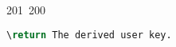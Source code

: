 201~200~\documentclass{article}
\begin{document}
\begin{lstlisting}[language=Python, caption=Hashing and Verifying Passwords with Argon2]
	                                                                                                                                                                                                                                                                                                	                                                                                                                                        	    	                                                                                                	                                                                                                                                                                                                                                                                                                                                	                                                                        	                                                                        	                                                                                                                            \return The derived user key.
	                                                                                                                                                                                                                                                                                                	                                                                                                                                        	    	                                                                                                	                                                                                                                                                                                                                                                                                                                                	                                                                        	                                                                        	                                                                                                                                """

\end{lstlisting}
\end{document}
